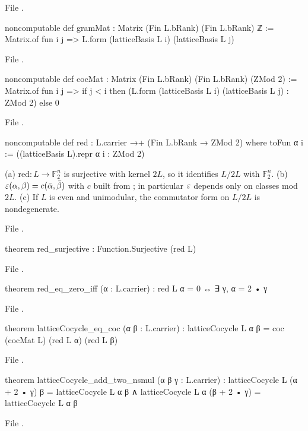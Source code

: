 \noindent File .
\begin{leancode}
noncomputable def gramMat : Matrix (Fin L.bRank) (Fin L.bRank) ℤ :=
  Matrix.of fun i j => L.form (latticeBasis L i) (latticeBasis L j)
\end{leancode}
\noindent File .
\begin{leancode}
noncomputable def cocMat : Matrix (Fin L.bRank) (Fin L.bRank) (ZMod 2) :=
  Matrix.of fun i j => if j < i then (L.form (latticeBasis L i) (latticeBasis L j) : ZMod 2) else 0
\end{leancode}
\noindent File .
\begin{leancode}
noncomputable def red : L.carrier →+ (Fin L.bRank → ZMod 2) where
  toFun α i := ((latticeBasis L).repr α i : ZMod 2)
\end{leancode}
\begin{theorem}\label{ch06:thm:descent}
(a) $\mathrm{red}:L\to\mathbb F_2^n$ is surjective with kernel $2L$, so it identifies $L/2L$ with
$\mathbb F_2^n$.  (b) $\varepsilon(\alpha,\beta)=c(\bar\alpha,\bar\beta)$ with $c$ built from
; in particular $\varepsilon$ depends only on classes mod $2L$.  (c) If $L$ is even and
unimodular, the commutator form on $L/2L$ is nondegenerate.
\end{theorem}
\noindent File .
\begin{leancode}
theorem red_surjective : Function.Surjective (red L)
\end{leancode}
\noindent File .
\begin{leancode}
theorem red_eq_zero_iff (α : L.carrier) : red L α = 0 ↔ ∃ γ, α = 2 • γ
\end{leancode}
\noindent File .
\begin{leancode}
theorem latticeCocycle_eq_coc (α β : L.carrier) :
    latticeCocycle L α β = coc (cocMat L) (red L α) (red L β)
\end{leancode}
\noindent File .
\begin{leancode}
theorem latticeCocycle_add_two_nsmul (α β γ : L.carrier) :
    latticeCocycle L (α + 2 • γ) β = latticeCocycle L α β ∧
      latticeCocycle L α (β + 2 • γ) = latticeCocycle L α β
\end{leancode}
\noindent File .
